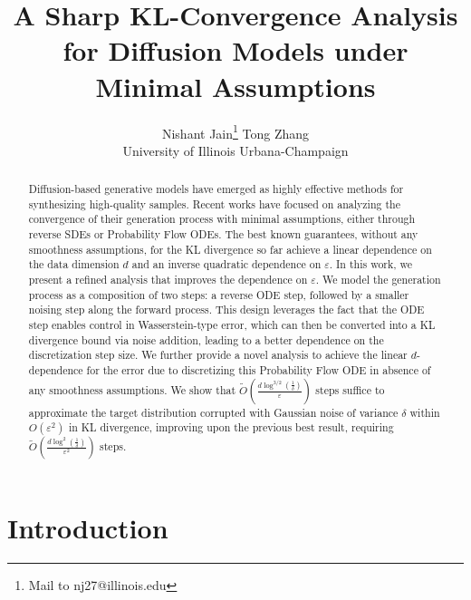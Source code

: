 \documentclass{article}
\title{A Sharp KL-Convergence Analysis for Diffusion Models under Minimal Assumptions}
\author{
  Nishant Jain\thanks{Mail to {nj27@illinois.edu}}   \quad
  Tong Zhang \\
  University of Illinois Urbana-Champaign \\
}
\begin{document}
\date{}

\maketitle

\begin{abstract}
    Diffusion-based generative models have emerged as highly effective methods for synthesizing high-quality samples. Recent works have focused on analyzing the convergence of their generation process with minimal assumptions, either through reverse SDEs or Probability Flow ODEs. The best known guarantees, without any smoothness assumptions, for the KL divergence so far achieve a linear dependence on the data dimension $d$ and an inverse quadratic dependence on $\varepsilon$. In this work, we present a refined analysis that improves the dependence on $\varepsilon$. We model the generation process as a composition of two steps: a reverse ODE step, followed by a smaller noising step along the forward process. This design leverages the fact that the ODE step enables control in Wasserstein-type error, which can then be converted into a KL divergence bound via noise addition, leading to a better dependence on the discretization step size. We further provide a novel analysis to achieve the linear $d$-dependence for the error due to discretizing this Probability Flow ODE in absence of any smoothness assumptions. We show that $\tilde{O}\left(\tfrac{d\log^{3/2}(\frac{1}{\delta})}{\varepsilon}\right)$ steps suffice to approximate the target distribution corrupted with Gaussian noise of variance $\delta$ within $O(\varepsilon^2)$ in KL divergence, improving upon the previous best result, requiring $\tilde{O}\left(\tfrac{d\log^2(\frac{1}{\delta})}{\varepsilon^2}\right)$ steps.
\end{abstract}

\section{Introduction}
\end{document}
